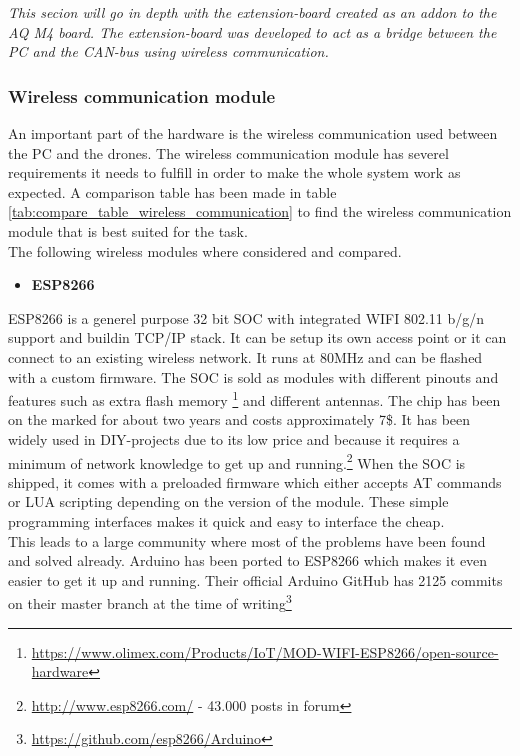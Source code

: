\textit{This secion will go in depth with the extension-board created as an addon to the AQ M4 board. The extension-board was developed to act as a bridge between the PC and the CAN-bus using wireless communication.} \\

\subsubsection*{Wireless communication module} \label{sec:wireless_communication_module}
An important part of the hardware is the wireless communication used between the PC and the drones.
The wireless communication module has severel requirements it needs to fulfill in order to make the whole system work as expected. A comparison table has been made in table \ref{tab:compare_table_wireless_communication} to find the wireless communication module that is best suited for the task. \\
The following wireless modules where considered and compared.
\begin{itemize}
	\item \textbf{ESP8266}
\end{itemize}

ESP8266 is a generel purpose 32 bit SOC with integrated WIFI 802.11 b/g/n support and buildin TCP/IP stack. It can be setup its own access point or it can connect to an existing wireless network.
It runs at 80MHz and can be flashed with a custom firmware. 
The SOC is sold as modules with different pinouts and features such as extra flash memory \footnote{\url{https://www.olimex.com/Products/IoT/MOD-WIFI-ESP8266/open-source-hardware}} and different antennas.
The chip has been on the marked for about two years and costs approximately 7\$. 
It has been widely used in DIY-projects due to its low price and because it requires a minimum of network knowledge to get up and running.\footnote{\url{http://www.esp8266.com/} - 43.000 posts in forum} When the SOC is shipped, it comes with a preloaded firmware which either accepts AT commands or LUA scripting depending on the version of the module. These simple programming interfaces makes it quick and easy to interface the cheap. \\
This leads to a large community where most of the problems have been found and solved already. Arduino has been ported to ESP8266 which makes it even easier to get it up and running. Their official Arduino GitHub has 2125 commits on their master branch at the time of writing\footnote{\url{https://github.com/esp8266/Arduino}} \\

